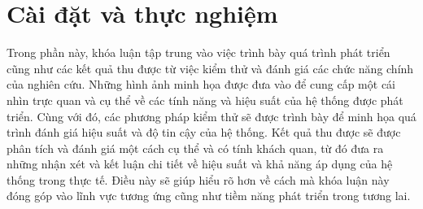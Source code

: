 \chapter{Cài đặt và thực nghiệm}
Trong phần này, khóa luận tập trung vào việc trình bày quá trình phát triển
cũng như các kết quả thu được từ
việc kiểm thử và đánh giá các chức năng chính của nghiên cứu. Những hình ảnh
minh họa được đưa vào để cung cấp một cái nhìn trực quan và cụ thể về các tính
năng và hiệu suất của hệ thống được phát triển. Cùng với đó, các phương pháp
kiểm thử sẽ được trình bày để minh họa quá trình đánh giá hiệu suất và độ tin
cậy của hệ thống. Kết quả thu được sẽ được phân tích và đánh giá một cách cụ
thể và có tính khách quan, từ đó đưa ra những nhận xét và kết luận chi tiết về
hiệu suất và khả năng áp dụng của hệ thống trong thực tế. Điều này sẽ giúp hiểu
rõ hơn về cách mà khóa luận này đóng góp vào lĩnh vực tương ứng cũng như tiềm
năng phát triển trong tương lai.

